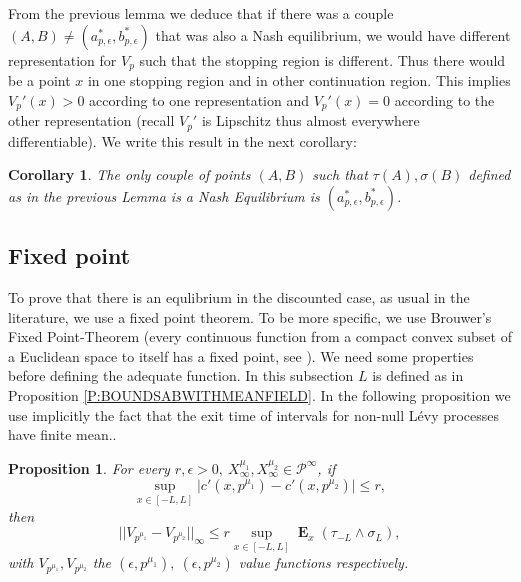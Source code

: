 \documentclass{article}
\newtheorem{corollary}[thm]{Corollary}
\newtheorem{proposition}[thm]{Proposition}
\newcommand\E{\operatorname{\mathbf{E}}}
\begin{document}
%
From the previous lemma we deduce that if there was a couple $(A,B) \neq (a^{\ast}_{p,\epsilon},b^{\ast}_{p,\epsilon})$ that was also a Nash equilibrium, we would have different representation for $V_p$ such that the stopping region is different. Thus there would be a point $x$ in one stopping region and in other continuation region. This implies $V_p'(x)>0$ according to one representation and $V_p'(x)=0$ according to the other representation (recall $V_p'$ is Lipschitz thus almost everywhere differentiable). We write this result in the next corollary: 
\begin{corollary}\label{Ch4:UniquenessDynkinMFG}
The only couple of points $(A,B)$ such that $\tau(A) , \sigma(B)$ defined as in the previous Lemma is a Nash Equilibrium is $(a^{\ast}_{p,\epsilon},b^{\ast}_{p,\epsilon})$.
\end{corollary}
%
\subsection{Fixed point}
To prove that there is an equlibrium in the discounted case, as usual in the literature, we use a fixed point theorem. To be more specific, we use Brouwer's  Fixed Point-Theorem (every continuous function from a compact convex subset of a Euclidean space to itself has a fixed point, see \cite[Section 6]{Brouwer}). We need some properties before defining the adequate function.
In this subsection $L$ is defined as in Proposition \ref{P:BOUNDSABWITHMEANFIELD}. In the following proposition we use implicitly the fact that the exit time of intervals for non-null L\'evy processes have finite mean..


\begin{proposition}\label{P:contintuityinP} For every $r, \epsilon>0, \ X^{\mu_1}_{\infty},X^{\mu_2}_{\infty} \in \mathcal{P}^{\infty}$,  if  $$\sup_{x \in [-L,L]} \vert c'(x, p^{\mu_1}) -c'(x,p^{\mu_2}) \vert  \leq r,$$ then 
$$\vert \vert V_{p^{\mu_1}}-V_{p^{\mu_2}} \vert \vert_{\infty}\leq r \sup_{x \in [-L,L]}\E_x ( \tau_{-L} \wedge \sigma_L) , $$ 
with $V_{p^{\mu_1}},V_{p^{\mu_2}}$ the $(\epsilon,p^{\mu_1}) , \ (\epsilon, p^{\mu_2})$ value functions respectively.
\end{proposition}
\end{document}
